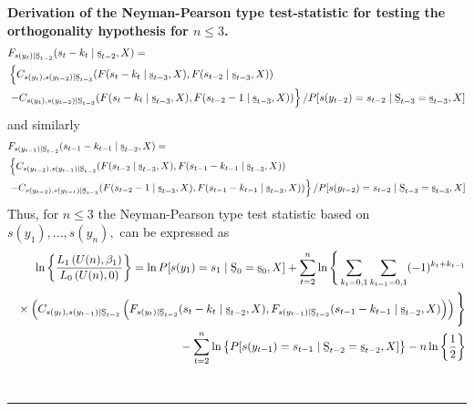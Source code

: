 \documentclass[harvard,11pt]{article}
\newenvironment{proof}[1][Proof]{\textbf{#1.} }{\  \rule{0.5em}{0.5em}}
\begin{document}
\begin{proof}[Derivation of the Neyman-Pearson type test-statistic for testing the orthogonality hypothesis for $n\leq 3$]
\begingroup
\allowdisplaybreaks
\begin{align*}
&F_{s(y_t)\mid\text{\b{S}}%
_{t-2}}(s_t-k_t\mid\text{\b{s}}%
_{t-2},X)=\\
&\left\{C_{s(y_t),s(y_{t-2})\mid\text{\b{S}}%
_{t-3}}(F(s_t-k_t\mid\text{\b{s}}%
_{t-3},X),F(s_{t-2}\mid\text{\b{s}}%
_{t-3},X))\right.\\
&\left.-C_{s(y_t),s(y_{t-2})\mid\text{\b{S}}%
_{t-3}}(F(s_t-k_t\mid\text{\b{s}}%
_{t-3},X),F(s_{t-2}-1\mid\text{\b{s}}%
_{t-3},X))\right\}/P[s(y_{t-2})=s_{t-2}\mid\text{\b{S}}%
_{t-3}=\text{\b{s}}%
_{t-3},X]
\end{align*}
 \endgroup
and similarly
\begingroup
\allowdisplaybreaks
\begin{align*}
&F_{s(y_{t-1})\mid\text{\b{S}}%
_{t-2}}(s_{t-1}-k_{t-1}\mid\text{\b{s}}%
_{t-2},X)=\\
&\left\{C_{s(y_{t-2}),s(y_{t-1})\mid\text{\b{S}}%
_{t-3}}(F(s_{t-2}\mid\text{\b{s}}%
_{t-3},X),F(s_{t-1}-k_{t-1}\mid\text{\b{s}}%
_{t-3},X))\right.\\
&\left.-C_{s(y_{t-2}),s(y_{t-1})\mid\text{\b{S}}%
_{t-3}}(F(s_{t-2}-1\mid\text{\b{s}}%
_{t-3},X),F(s_{t-1}-k_{t-1}\mid\text{\b{s}}%
_{t-3},X))\right\}/P[s(y_{t-2})=s_{t-2}\mid\text{\b{S}}%
_{t-3}=\text{\b{s}}%
_{t-3},X]
\end{align*}
\endgroup
Thus, for $n\leq 3$ the Neyman-Pearson type test statistic based on $%
s(y_{1}),...,s(y_{n}),$ can be expressed as%
\begingroup
\allowdisplaybreaks
\begin{align*}
\ln \left\{ \frac{L_1\left( U(n),\beta _{1}\right) }{L
_{0}\left( U(n),0\right) }\right\} =\ln P[s(y_{1})=s_{1}\mid \text{\b{S}}_{0}=\text{\b{s}}_{0},X]+\sum\limits_{t=2}^{n}\ln\Bigg\{\sum\limits_{k_t=0,1}\sum\limits_{k_{t-1}=0,1}(-1)^{k_t+k_{t-1}} \\
\textcolor{white}{=}\times \left(C_{s(y_t),s(y_{t-1})\mid \text{\b{S}}%
_{t-2}}\left(F_{s(y_t)\mid \text{\b{S}}%
_{t-2} }(s_t-k_t\mid \text{\b{s}}%
_{t-2},X),F_{s(y_{t-1})\mid \text{\b{S}}%
_{t-2}}(s_{t-1}-k_{t-1}\mid \text{\b{s}}%
_{t-2},X)\right)\right)\Bigg\}\\
\textcolor{white}{=}-\sum\limits_{t=2}^{n}\ln\left\{P[s(y_{t-1})=s_{t-1}\mid \text{\b{S}}_{t-2}=\text{\b{s}}_{t-2},X]\right\}-n\ln \left\{ \frac{1}{2}\right\}
\end{align*}%
\endgroup
\end{proof}
\end{document}
